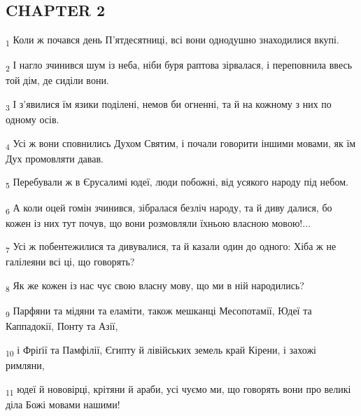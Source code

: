 \subsection{CHAPTER 2}
\begin{tcolorbox}
\textsubscript{1} Коли ж почався день П'ятдесятниці, всі вони однодушно знаходилися вкупі.
\end{tcolorbox}
\begin{tcolorbox}
\textsubscript{2} І нагло зчинився шум із неба, ніби буря раптова зірвалася, і переповнила ввесь той дім, де сиділи вони.
\end{tcolorbox}
\begin{tcolorbox}
\textsubscript{3} І з'явилися їм язики поділені, немов би огненні, та й на кожному з них по одному осів.
\end{tcolorbox}
\begin{tcolorbox}
\textsubscript{4} Усі ж вони сповнились Духом Святим, і почали говорити іншими мовами, як їм Дух промовляти давав.
\end{tcolorbox}
\begin{tcolorbox}
\textsubscript{5} Перебували ж в Єрусалимі юдеї, люди побожні, від усякого народу під небом.
\end{tcolorbox}
\begin{tcolorbox}
\textsubscript{6} А коли оцей гомін зчинився, зібралася безліч народу, та й диву далися, бо кожен із них тут почув, що вони розмовляли їхньою власною мовою!...
\end{tcolorbox}
\begin{tcolorbox}
\textsubscript{7} Усі ж побентежилися та дивувалися, та й казали один до одного: Хіба ж не галілеяни всі ці, що говорять?
\end{tcolorbox}
\begin{tcolorbox}
\textsubscript{8} Як же кожен із нас чує свою власну мову, що ми в ній народились?
\end{tcolorbox}
\begin{tcolorbox}
\textsubscript{9} Парфяни та мідяни та еламіти, також мешканці Месопотамії, Юдеї та Каппадокії, Понту та Азії,
\end{tcolorbox}
\begin{tcolorbox}
\textsubscript{10} і Фріґії та Памфілії, Єгипту й лівійських земель край Кірени, і захожі римляни,
\end{tcolorbox}
\begin{tcolorbox}
\textsubscript{11} юдеї й нововірці, крітяни й араби, усі чуємо ми, що говорять вони про великі діла Божі мовами нашими!
\end{tcolorbox}

